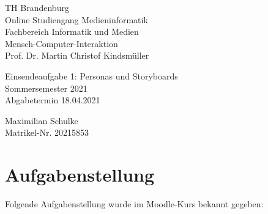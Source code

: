 \documentclass{article}
\begin{document}
\begin{titlepage}
	\begin{flushleft}
		TH Brandenburg \\
		Online Studiengang Medieninformatik \\
		Fachbereich Informatik und Medien \\
		Mensch-Computer-Interaktion \\
		Prof. Dr. Martin Christof Kindsmüller
	\end{flushleft}

	\vfill

	\begin{center}
		\Large{Einsendeaufgabe 1: Personas und Storyboards}\\[0.5em]
		\large{Sommersemester 2021}\\[0.25em]
		\large{Abgabetermin 18.04.2021}
	\end{center}

	\vfill

	\begin{flushright}
		Maximilian Schulke \\
		Matrikel-Nr. 20215853
	\end{flushright}
\end{titlepage}

\tableofcontents

\vfill

\section{Aufgabenstellung}

Folgende Aufgabenstellung wurde im Moodle-Kurs bekannt gegeben:
\end{document}
